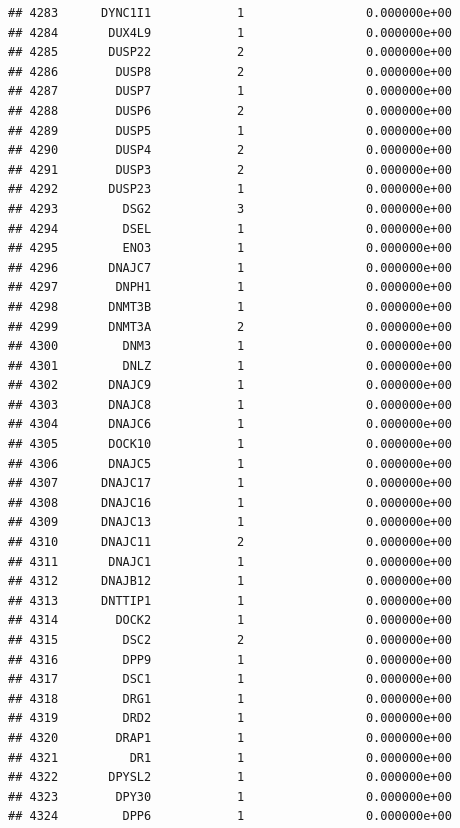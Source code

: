 \documentclass[
]{article}
\begin{document}
\begin{verbatim}
## 4283      DYNC1I1            1                 0.000000e+00
## 4284       DUX4L9            1                 0.000000e+00
## 4285       DUSP22            2                 0.000000e+00
## 4286        DUSP8            2                 0.000000e+00
## 4287        DUSP7            1                 0.000000e+00
## 4288        DUSP6            2                 0.000000e+00
## 4289        DUSP5            1                 0.000000e+00
## 4290        DUSP4            2                 0.000000e+00
## 4291        DUSP3            2                 0.000000e+00
## 4292       DUSP23            1                 0.000000e+00
## 4293         DSG2            3                 0.000000e+00
## 4294         DSEL            1                 0.000000e+00
## 4295         ENO3            1                 0.000000e+00
## 4296       DNAJC7            1                 0.000000e+00
## 4297        DNPH1            1                 0.000000e+00
## 4298       DNMT3B            1                 0.000000e+00
## 4299       DNMT3A            2                 0.000000e+00
## 4300         DNM3            1                 0.000000e+00
## 4301         DNLZ            1                 0.000000e+00
## 4302       DNAJC9            1                 0.000000e+00
## 4303       DNAJC8            1                 0.000000e+00
## 4304       DNAJC6            1                 0.000000e+00
## 4305       DOCK10            1                 0.000000e+00
## 4306       DNAJC5            1                 0.000000e+00
## 4307      DNAJC17            1                 0.000000e+00
## 4308      DNAJC16            1                 0.000000e+00
## 4309      DNAJC13            1                 0.000000e+00
## 4310      DNAJC11            2                 0.000000e+00
## 4311       DNAJC1            1                 0.000000e+00
## 4312      DNAJB12            1                 0.000000e+00
## 4313      DNTTIP1            1                 0.000000e+00
## 4314        DOCK2            1                 0.000000e+00
## 4315         DSC2            2                 0.000000e+00
## 4316         DPP9            1                 0.000000e+00
## 4317         DSC1            1                 0.000000e+00
## 4318         DRG1            1                 0.000000e+00
## 4319         DRD2            1                 0.000000e+00
## 4320        DRAP1            1                 0.000000e+00
## 4321          DR1            1                 0.000000e+00
## 4322       DPYSL2            1                 0.000000e+00
## 4323        DPY30            1                 0.000000e+00
## 4324         DPP6            1                 0.000000e+00

\end{verbatim}
\end{document}
